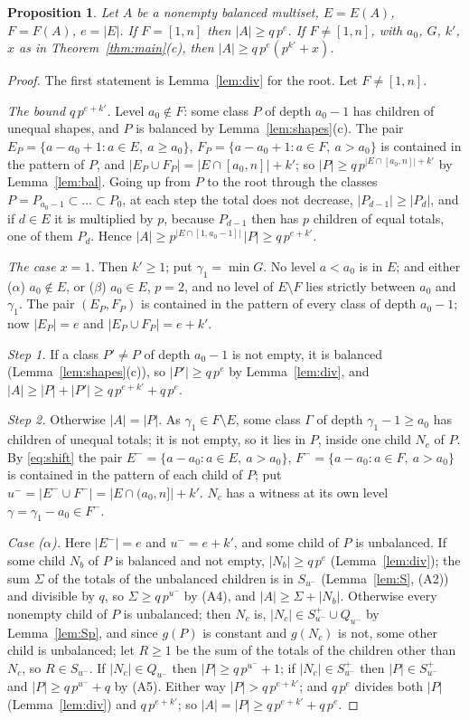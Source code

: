\documentclass[11pt,a4paper]{amsart}
\newtheorem{proposition}[theorem]{Proposition}
\theoremstyle{definition}
\theoremstyle{remark}
\newcommand{\Sp}{S^{+}}
\begin{document}
\begin{proposition}\label{prop:B}
Let $A$ be a nonempty balanced multiset, $E=E(A)$, $F=F(A)$, $e=|E|$.
If $F=[1,n]$ then $|A|\ge q\,p^{e}$. If $F\ne[1,n]$, with $a_0$, $G$, $k'$, $x$ as in
Theorem~\ref{thm:main}(c), then $|A|\ge q\,p^{e}(p^{k'}+x)$.
\end{proposition}
\begin{proof}
The first statement is Lemma~\ref{lem:div} for the root. Let $F\ne[1,n]$.

\emph{The bound $q\,p^{e+k'}$.} Level $a_0\notin F$: some class $P$ of depth $a_0-1$ has children of unequal
shapes, and $P$ is balanced by Lemma~\ref{lem:shapes}(c). The pair
$E_P=\{a-a_0+1:a\in E,\ a\ge a_0\}$, $F_P=\{a-a_0+1:a\in F,\ a>a_0\}$ is contained in the pattern of $P$, and
$|E_P\cup F_P|=|E\cap[a_0,n]|+k'$; so $|P|\ge q\,p^{|E\cap[a_0,n]|+k'}$ by Lemma~\ref{lem:bal}. Going up from
$P$ to the root through the classes $P=P_{a_0-1}\subset\dots\subset P_0$, at each step the total does not decrease, $|P_{d-1}|\ge|P_d|$, and if $d\in E$ it is multiplied by $p$,
because $P_{d-1}$ then has $p$ children of equal totals, one of them $P_d$. Hence
$|A|\ge p^{|E\cap[1,a_0-1]|}\,|P|\ge q\,p^{e+k'}$.

\emph{The case $x=1$.} Then $k'\ge1$; put $\gamma_1=\min G$. No level $a<a_0$ is in $E$; and either
($\alpha$) $a_0\notin E$, or ($\beta$) $a_0\in E$, $p=2$, and no level of $E\setminus F$ lies strictly between
$a_0$ and $\gamma_1$. The pair $(E_P,F_P)$ is contained in the pattern of every class of depth $a_0-1$; now
$|E_P|=e$ and $|E_P\cup F_P|=e+k'$.

\emph{Step 1.} If a class $P'\ne P$ of depth $a_0-1$ is not empty, it is balanced
(Lemma~\ref{lem:shapes}(c)), so $|P'|\ge q\,p^e$ by Lemma~\ref{lem:div}, and
$|A|\ge|P|+|P'|\ge q\,p^{e+k'}+q\,p^e$.

\emph{Step 2.} Otherwise $|A|=|P|$. As $\gamma_1\in F\setminus E$, some class $\Gamma$ of depth $\gamma_1-1\ge a_0$ has
children of unequal totals; it is not empty, so it lies in $P$, inside one child $N_c$ of $P$. By
\eqref{eq:shift} the pair $E^-=\{a-a_0:a\in E,\ a>a_0\}$, $F^-=\{a-a_0:a\in F,\ a>a_0\}$ is contained in the
pattern of each child of $P$; put $u^-=|E^-\cup F^-|=|E\cap(a_0,n]|+k'$. $N_c$ has a witness at its own level
$\gamma=\gamma_1-a_0\in F^-$.

\emph{Case ($\alpha$).} Here $|E^-|=e$ and $u^-=e+k'$, and some child of $P$ is unbalanced. If some child
$N_b$ of $P$ is balanced and not empty, $|N_b|\ge q\,p^e$ (Lemma~\ref{lem:div}); the sum $\Sigma$ of the totals
of the unbalanced children is in $S_{u^-}$ (Lemma~\ref{lem:S}, (A2)) and divisible by $q$, so
$\Sigma\ge q\,p^{u^-}$ by (A4), and $|A|\ge\Sigma+|N_b|$. Otherwise every nonempty child of $P$ is unbalanced;
then $N_c$ is, $|N_c|\in\Sp_{u^-}\cup Q_{u^-}$ by Lemma~\ref{lem:Sp}, and since $g(P)$ is constant and
$g(N_c)$ is not, some other child is unbalanced; let $R\ge1$ be the sum of the totals of the children other
than $N_c$, so $R\in S_{u^-}$. If $|N_c|\in Q_{u^-}$ then $|P|\ge q\,p^{u^-}+1$; if $|N_c|\in\Sp_{u^-}$ then
$|P|\in\Sp_{u^-}$ and $|P|\ge q\,p^{u^-}+q$ by (A5). Either way $|P|>q\,p^{e+k'}$; and $q\,p^e$ divides both
$|P|$ (Lemma~\ref{lem:div}) and $q\,p^{e+k'}$; so $|A|=|P|\ge q\,p^{e+k'}+q\,p^e$.


\end{proof}
\end{document}

